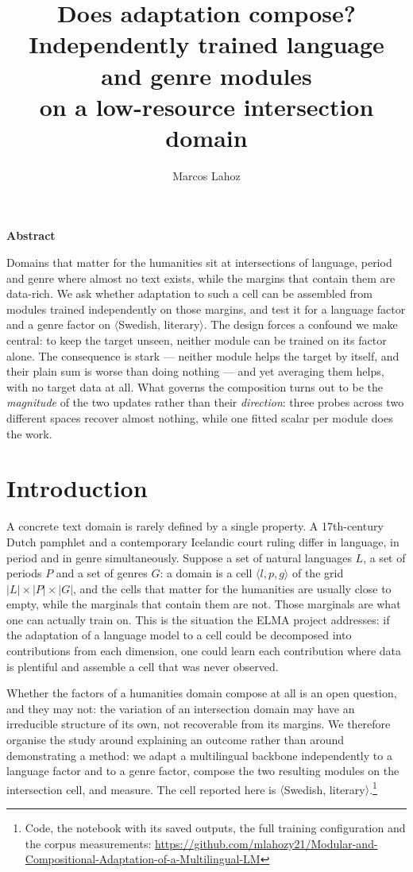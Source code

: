 \documentclass[10pt,twocolumn,a4paper]{article}
\title{\vspace{-1.4cm}\LARGE\bfseries Does adaptation compose?\\[3pt]
\large Independently trained language and genre modules\\
on a low-resource intersection domain}
\author{\normalsize Marcos Lahoz}
\date{}
\newenvironment{aclabstract}
  {\begin{center}\large\bfseries Abstract\end{center}\vspace{-2pt}%
   \begingroup\leftskip=0.45cm\rightskip=0.45cm\small}
  {\par\endgroup\vspace{6pt}}
\begin{document}
\maketitle

\begin{aclabstract}
\noindent
Domains that matter for the humanities sit at intersections of language, period
and genre where almost no text exists, while the margins that contain them are
data-rich. We ask whether adaptation to such a cell can be assembled from
modules trained independently on those margins, and test it for a language
factor and a genre factor on $\langle$Swedish, literary$\rangle$. The design
forces a confound we make central: to keep the target unseen, neither module can
be trained on its factor alone. The consequence is stark --- neither module helps the
target by itself, and their plain sum is worse than doing nothing --- and yet
averaging them helps, with no target data at all. What governs the composition
turns out to be the \emph{magnitude} of the two updates rather than their
\emph{direction}: three probes across two different spaces recover almost
nothing, while one fitted scalar per module does the work.
\end{aclabstract}

\section{Introduction}

A concrete text domain is rarely defined by a single property. A 17th-century
Dutch pamphlet and a contemporary Icelandic court ruling differ in language, in
period and in genre simultaneously. Suppose a set of natural languages $L$, a
set of periods $P$ and a set of genres $G$: a domain is a cell $\langle
l,p,g\rangle$ of the grid $|L|\times|P|\times|G|$, and the cells that matter for
the humanities are usually close to empty, while the marginals that contain them
are not. Those marginals are
what one can actually train on. This is the situation the ELMA project
addresses: if the adaptation of a language model to a cell could be decomposed
into contributions from each dimension, one could learn each contribution where
data is plentiful and assemble a cell that was never observed.

Whether the factors of a humanities domain compose at all is an open question,
and they may not: the variation of an intersection domain may have an
irreducible structure of its own, not recoverable from its margins. We therefore organise the study around explaining
an outcome rather than around demonstrating a method: we adapt a multilingual backbone independently to a
language factor and to a genre factor, compose the two resulting modules on the
intersection cell, and measure. The cell reported here is $\langle$Swedish,
literary$\rangle$.\footnote{Code, the notebook with its saved outputs, the full
training configuration and the corpus measurements:
\url{https://github.com/mlahozy21/Modular-and-Compositional-Adaptation-of-a-Multilingual-LM}}
\end{document}
